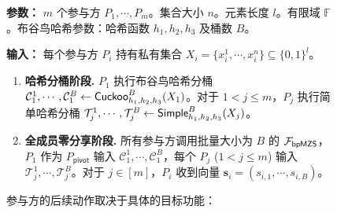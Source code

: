 \begin{figure}[!htb]
\begin{framed}
\begin{minipage}[c]{\textwidth}
\begin{trivlist}
\item \textbf{参数：} $m$ 个参与方 $P_1, \cdots, P_m$。集合大小 $n$。元素长度 $l$。有限域 $\mathbb{F}$。布谷鸟哈希参数：哈希函数 $h_1, h_2, h_3$ 及桶数 $B$。
\item \textbf{输入：} 每个参与方 $P_i$ 持有私有集合 $X_i = \{x_i^1,\cdots, x_i^n\} \subseteq \{0,1\}^l$。

\begin{enumerate}[itemsep=2pt,topsep=0pt,parsep=0pt,leftmargin=15pt]
\item \textbf{哈希分桶阶段.} $P_1$ 执行布谷鸟哈希分桶 $\mathcal{C}_1^1, \cdots, \mathcal{C}_1^B \gets \mathsf{Cuckoo}_{h_1,h_2,h_3}^B(X_1)$。对于 $1 < j  \le m$，$P_j$ 执行简单哈希分桶 $\mathcal{T}_j^1, \cdots, \mathcal{T}_j^B \gets \mathsf{Simple}_{h_1,h_2,h_3}^B(X_j)$。
\item \textbf{全成员零分享阶段.} 所有参与方调用批量大小为 $B$ 的 $\mathcal{F}_\mathsf{bpMZS}$，$P_1$ 作为 $P_\mathsf{pivot}$ 输入 $\mathcal{C}_1^1, \cdots, \mathcal{C}_1^B$，每个 $P_j$ ($1 < j  \le m$) 输入 $\mathcal{T}_j^1, \cdots, \mathcal{T}_j^B$。对于 $j \in [m]$，$P_i$ 收到向量 $\textbf{s}_i=(s_{i,1},\cdots,s_{i,B})$。
\end{enumerate}

参与方的后续动作取决于具体的目标功能：


\end{trivlist}
\end{minipage}
\end{framed}
\end{figure}
